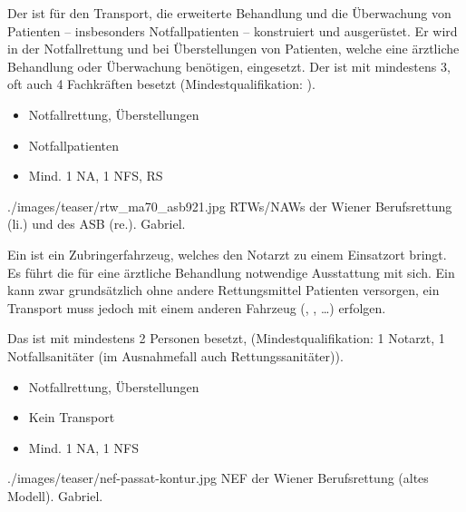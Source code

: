 {%
%
%
Der  ist für den Transport, die erweiterte
 Behandlung und die Überwachung von Patienten
-- insbesonders Notfallpatienten -- konstruiert und ausgerüstet.
Er wird in der Notfallrettung und bei Überstellungen von
Patienten, welche eine ärztliche Behandlung oder Überwachung
benötigen, eingesetzt.
Der  ist mit mindestens 3, oft auch 4 Fachkräften besetzt
(Mindestqualifikation: ).



}{
\begin{itemize}
  \item Notfallrettung, Überstellungen 
  \item Notfallpatienten
  \item Mind. 1 NA, 1 NFS,  RS
\end{itemize}
}
{./images/teaser/rtw_ma70_asb921.jpg}
{RTWs/NAWs der Wiener Berufsrettung (li.) und des ASB (re.).}
{Gabriel.}


{%
%
%
Ein  ist ein Zubringerfahrzeug, welches den Notarzt
zu einem Einsatzort bringt. Es führt die für eine ärztliche
Behandlung notwendige Ausstattung mit sich. Ein 
kann zwar grundsätzlich ohne andere Rettungsmittel Patienten
versorgen, ein Transport muss jedoch mit einem anderen
Fahrzeug (, , \ldots) erfolgen.

Das  ist mit mindestens 2 Personen besetzt,
(Mindestqualifikation: 1 Notarzt, 1 Notfallsanitäter (im
Ausnahmefall auch Rettungssanitäter)).





}{
\begin{itemize}
  \item Notfallrettung, Überstellungen 
  \item Kein Transport
  \item Mind. 1 NA, 1 NFS
\end{itemize}
}
{./images/teaser/nef-passat-kontur.jpg}
{NEF der Wiener Berufsrettung (altes Modell).}
{Gabriel.}


